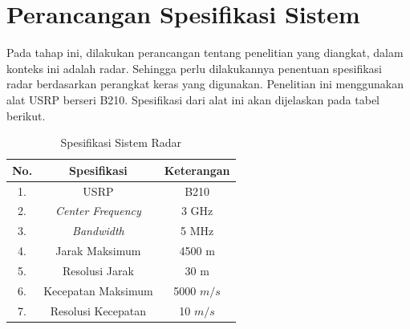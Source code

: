\section{Perancangan Spesifikasi Sistem}
Pada tahap ini, dilakukan perancangan tentang penelitian yang diangkat, dalam konteks ini adalah radar. Sehingga perlu dilakukannya penentuan spesifikasi radar berdasarkan perangkat keras yang digunakan. Penelitian ini menggunakan alat USRP berseri B210.  Spesifikasi dari alat ini akan dijelaskan pada tabel berikut.

\begin{center}
	\begin{longtable}{| c | c | c |}
		\caption{Spesifikasi Sistem Radar}
		\label{tab:spekRadar}\\
		\hline
		No. & Spesifikasi 					& Keterangan\\\hline
		1.  & USRP 							& B210\\
		2.  & \textit{Center Frequency}  	& 3 GHz \\
		3.  & \textit{Bandwidth} 			& 5 MHz \\
		4.  & Jarak Maksimum 				& 4500 m \\
		5.  & Resolusi Jarak 				& 30 m \\
		6.  & Kecepatan Maksimum			& 5000 $m/s$ \\
		7.  & Resolusi Kecepatan 			& 10 $m/s$\\
		\hline
	\end{longtable}
\end{center}

